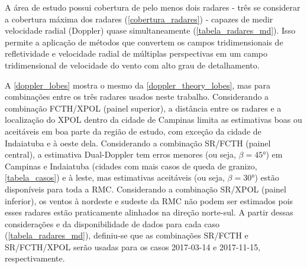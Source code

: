 A área de estudo possui cobertura de pelo menos dois radares - três se considerar a cobertura máxima dos radares (\autoref{cobertura_radares}) - capazes de medir velocidade radial (Doppler) quase simultaneamente (\autoref{tabela_radares_md}). Isso permite a aplicação de métodos que convertem os campos tridimensionais de refletividade e velocidade radial de múltiplas perspectivas em um campo tridimensional de velocidade do vento com alto grau de detalhamento.

\begin{table}[htb]
\end{table}

A \autoref{doppler_lobes} mostra o mesmo da \autoref{doppler_theory_lobes}, mas para combinações entre os três radares usados neste trabalho. Considerando a combinação FCTH/XPOL (painel superior), a distância entre os radares e a localização do XPOL dentro da cidade de Campinas limita as estimativas boas ou aceitáveis em boa parte da região de estudo, com exceção da cidade de Indaiatuba e à oeste dela. Considerando a combinação SR/FCTH (painel central), a estimativa Dual-Doppler tem erros menores (ou seja, $\beta=\ang{45}$) em Campinas e Indaiatuba (cidades com mais casos de queda de granizo, \autoref{tabela_casos}) e à leste, mas estimativas aceitáveis (ou seja, $\beta=\ang{30}$) estão disponíveis para toda a RMC. Considerando a combinação SR/XPOL (painel inferior), os ventos à nordeste e sudeste da RMC não podem ser estimados pois esses radares estão praticamente alinhados na direção norte-sul. A partir dessas considerações e da disponibilidade de dados para cada caso (\autoref{tabela_radares_md}), definiu-se que as combinações SR/FCTH e SR/FCTH/XPOL serão usadas para os casos 2017-03-14 e 2017-11-15, respectivamente.

